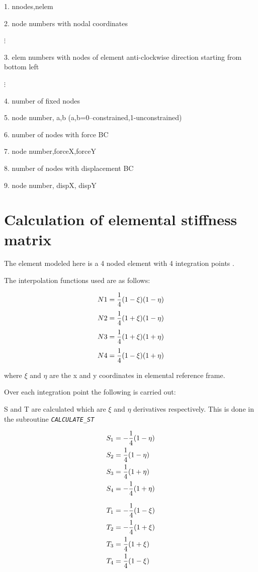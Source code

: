 \documentclass[review]{elsarticle}
\begin{document}
1. nnodes,nelem

2. node numbers with nodal coordinates 

\hspace{3em}$\vdots$

3. elem numbers with nodes of element anti-clockwise direction starting from bottom left

\hspace{3em}$\vdots$

4. number of fixed nodes

5. node number, a,b (a,b=0--constrained,1-unconstrained)

6. number of nodes with force BC

7. node number,forceX,forceY

8. number of nodes with displacement BC
	
9. node number, dispX, dispY



\section*{Calculation of elemental stiffness matrix}
The element modeled here is a 4 noded element with 4 integration points \cite{entwistle1999basic}.

The interpolation functions used are as follows:

\[ N1={1\over4}(1-\xi)(1-\eta) \]
\[ N2={1\over4}(1+\xi)(1-\eta) \]
\[ N3={1\over4}(1+\xi)(1+\eta) \]
\[ N4={1\over4}(1-\xi)(1+\eta) \]

where $\xi$ and $\eta$ are the x and y coordinates in elemental reference frame. 

Over each integration point the following is carried out:

S and T are calculated which are $\xi$ and $\eta$ derivatives respectively. This is done in the subroutine \textit{\texttt{CALCULATE\_ST}}

\begin{minipage}{0.5\linewidth}
\begin{align*} 
S_1&=-{1\over4}(1-\eta) \\
S_2&={1\over4}(1-\eta) \\
S_3&={1\over4}(1+\eta) \\
S_4&=-{1\over4}(1+\eta) 
\end{align*}
\end{minipage}
\begin{minipage}{0.5\linewidth}
\begin{align*} 
T_1&=-{1\over4}(1-\xi) \\
T_2&=-{1\over4}(1+\xi) \\
T_3&={1\over4}(1+\xi) \\
T_4&={1\over4}(1-\xi) \\
\end{align*}
\end{minipage}
\bigskip
\end{document}
